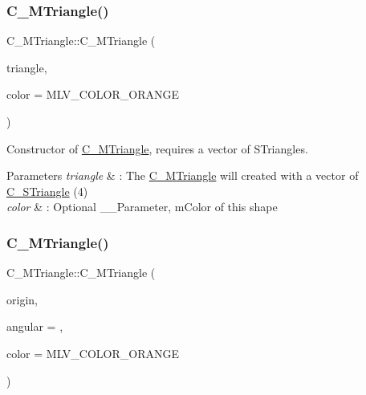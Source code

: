 \subsubsection{\texorpdfstring{C\+\_\+\+M\+Triangle()}{C\_MTriangle()}\hspace{0.1cm}{\footnotesize\ttfamily [5/6]}}
{\footnotesize\ttfamily C\+\_\+\+M\+Triangle\+::\+C\+\_\+\+M\+Triangle (\begin{DoxyParamCaption}\item[{const std\+::vector$<$ \hyperlink{classC__STriangle}{C\+\_\+\+S\+Triangle} $>$ \&}]{triangle,  }\item[{M\+L\+V\+\_\+\+Color}]{color = {\ttfamily MLV\+\_\+COLOR\+\_\+ORANGE} }\end{DoxyParamCaption})\hspace{0.3cm}{\ttfamily [explicit]}}



Constructor of \hyperlink{classC__MTriangle}{C\+\_\+\+M\+Triangle}, requires a vector of S\+Triangles. 


\begin{DoxyParams}{Parameters}
{\em triangle} & \+: The \hyperlink{classC__MTriangle}{C\+\_\+\+M\+Triangle} will created with a vector of \hyperlink{classC__STriangle}{C\+\_\+\+S\+Triangle} (4) \\
\hline
{\em color} & \+: Optional \+\_\+\+\_\+\+Parameter, m\+Color of this shape \\
\hline
\end{DoxyParams}
\mbox{\label{classC__MTriangle_a5a8ffada7ee743f463304b1093394404}} 
\subsubsection{\texorpdfstring{C\+\_\+\+M\+Triangle()}{C\_MTriangle()}\hspace{0.1cm}{\footnotesize\ttfamily [6/6]}}
{\footnotesize\ttfamily C\+\_\+\+M\+Triangle\+::\+C\+\_\+\+M\+Triangle (\begin{DoxyParamCaption}\item[{const \hyperlink{classT__Point}{T\+\_\+\+Point}$<$ double $>$ \&}]{origin,  }\item[{double}]{angular = {},  }\item[{M\+L\+V\+\_\+\+Color}]{color = {\ttfamily MLV\+\_\+COLOR\+\_\+ORANGE} }\end{DoxyParamCaption})\hspace{0.3cm}{\ttfamily [explicit]}}



